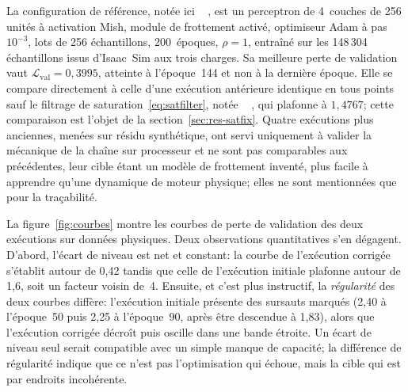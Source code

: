 \documentclass[a4paper, oneside]{article}
\newcommand{\code}[1]{%
    \mbox{\ttfamily\small%
        \detokenize{#1}%
    }%
}
\begin{document}
La configuration de référence, notée ici \code{isaac-satfix}, est un perceptron
de 4~couches de 256 unités à activation Mish, module de frottement activé,
optimiseur Adam à pas $10^{-3}$, lots de 256 échantillons, 200~époques,
$\rho = 1$, entraîné sur les 148\,304 échantillons issus d'Isaac~Sim aux trois
charges. Sa meilleure perte de validation vaut
$\mathcal{L}_{\mathrm{val}} = 0{,}3995$, atteinte à l'époque~144 et non à la
dernière époque. Elle se compare directement à celle d'une exécution
antérieure identique en tous points sauf le filtrage
de saturation~\eqref{eq:satfilter}, notée \code{isaac-first-real}, qui plafonne
à $1{,}4767$; cette comparaison est l'objet de la
section~\ref{sec:res-satfix}. Quatre exécutions plus anciennes, menées sur
résidu synthétique, ont servi uniquement à valider la mécanique de la chaîne sur
processeur et ne sont pas comparables aux précédentes, leur cible étant un
modèle de frottement inventé, plus facile à apprendre qu'une dynamique de
moteur physique; elles ne sont mentionnées que pour la traçabilité.

La figure~\ref{fig:courbes} montre les courbes de perte de validation des deux
exécutions sur données physiques. Deux observations quantitatives s'en dégagent.
D'abord, l'écart de niveau est net et constant: la courbe de l'exécution
corrigée s'établit autour de 0{,}42 tandis que celle de l'exécution initiale
plafonne autour de 1{,}6, soit un facteur voisin de~4. Ensuite, et c'est plus
instructif, la \emph{régularité} des deux courbes diffère: l'exécution initiale
présente des sursauts marqués (2{,}40 à l'époque~50 puis 2{,}25 à l'époque~90,
après être descendue à 1{,}83), alors que l'exécution corrigée décroît puis
oscille dans une bande étroite. Un écart de niveau seul serait compatible avec
un simple manque de capacité; la différence de régularité indique que ce n'est
pas l'optimisation qui échoue, mais la cible qui est par endroits incohérente.
\end{document}
